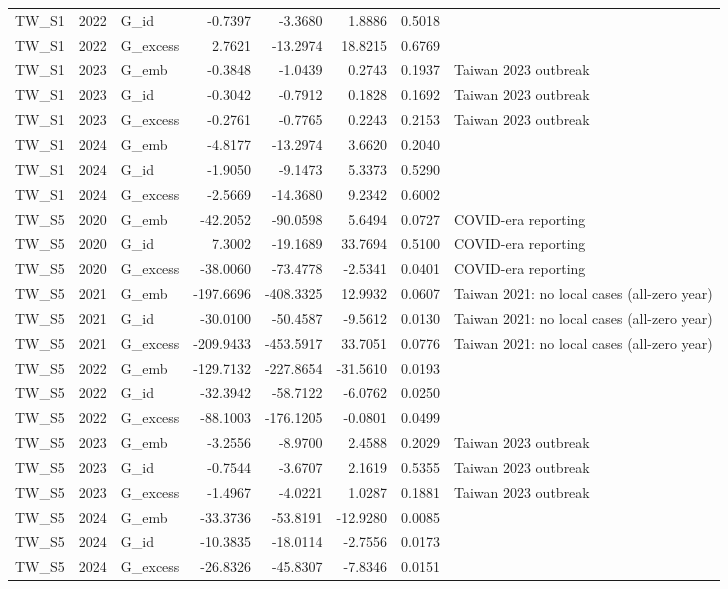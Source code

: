\begin{tabular}{lllrrrrl}
TW\_S1 & 2022 & G\_id & -0.7397 & -3.3680 & 1.8886 & 0.5018 &  \\
TW\_S1 & 2022 & G\_excess & 2.7621 & -13.2974 & 18.8215 & 0.6769 &  \\
TW\_S1 & 2023 & G\_emb & -0.3848 & -1.0439 & 0.2743 & 0.1937 & Taiwan 2023 outbreak \\
TW\_S1 & 2023 & G\_id & -0.3042 & -0.7912 & 0.1828 & 0.1692 & Taiwan 2023 outbreak \\
TW\_S1 & 2023 & G\_excess & -0.2761 & -0.7765 & 0.2243 & 0.2153 & Taiwan 2023 outbreak \\
TW\_S1 & 2024 & G\_emb & -4.8177 & -13.2974 & 3.6620 & 0.2040 &  \\
TW\_S1 & 2024 & G\_id & -1.9050 & -9.1473 & 5.3373 & 0.5290 &  \\
TW\_S1 & 2024 & G\_excess & -2.5669 & -14.3680 & 9.2342 & 0.6002 &  \\
TW\_S5 & 2020 & G\_emb & -42.2052 & -90.0598 & 5.6494 & 0.0727 & COVID-era reporting \\
TW\_S5 & 2020 & G\_id & 7.3002 & -19.1689 & 33.7694 & 0.5100 & COVID-era reporting \\
TW\_S5 & 2020 & G\_excess & -38.0060 & -73.4778 & -2.5341 & 0.0401 & COVID-era reporting \\
TW\_S5 & 2021 & G\_emb & -197.6696 & -408.3325 & 12.9932 & 0.0607 & Taiwan 2021: no local cases (all-zero year) \\
TW\_S5 & 2021 & G\_id & -30.0100 & -50.4587 & -9.5612 & 0.0130 & Taiwan 2021: no local cases (all-zero year) \\
TW\_S5 & 2021 & G\_excess & -209.9433 & -453.5917 & 33.7051 & 0.0776 & Taiwan 2021: no local cases (all-zero year) \\
TW\_S5 & 2022 & G\_emb & -129.7132 & -227.8654 & -31.5610 & 0.0193 &  \\
TW\_S5 & 2022 & G\_id & -32.3942 & -58.7122 & -6.0762 & 0.0250 &  \\
TW\_S5 & 2022 & G\_excess & -88.1003 & -176.1205 & -0.0801 & 0.0499 &  \\
TW\_S5 & 2023 & G\_emb & -3.2556 & -8.9700 & 2.4588 & 0.2029 & Taiwan 2023 outbreak \\
TW\_S5 & 2023 & G\_id & -0.7544 & -3.6707 & 2.1619 & 0.5355 & Taiwan 2023 outbreak \\
TW\_S5 & 2023 & G\_excess & -1.4967 & -4.0221 & 1.0287 & 0.1881 & Taiwan 2023 outbreak \\
TW\_S5 & 2024 & G\_emb & -33.3736 & -53.8191 & -12.9280 & 0.0085 &  \\
TW\_S5 & 2024 & G\_id & -10.3835 & -18.0114 & -2.7556 & 0.0173 &  \\
TW\_S5 & 2024 & G\_excess & -26.8326 & -45.8307 & -7.8346 & 0.0151 &  \\
\bottomrule
\end{tabular}
